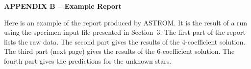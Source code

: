 \pagebreak
{\bf APPENDIX B -- Example Report}

\vspace{5mm}
Here is an example of the report produced by ASTROM.  It is the
result of a run using the specimen input file presented in Section~3.
The first part of the report lists the raw data.  The second part gives
the results of the 4-coefficient solution.  The third part (next
page) gives the results of the 6-coefficient solution.  The
fourth part gives the predictions for the unknown stars.

\vspace{20mm}

\begin{tiny}


\end{tiny}
